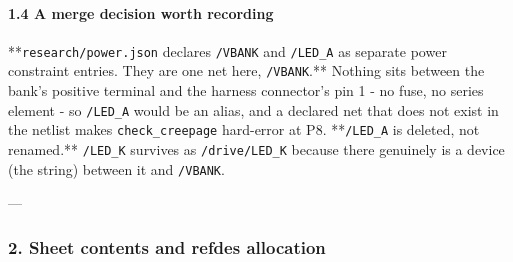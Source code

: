 \documentclass[11pt,a4paper]{article}
\begin{document}
\paragraph*{1.4 A merge decision worth recording}
{*}{*}\texttt{research/power.json} declares \texttt{/VBANK} and \texttt{/LED\_A} as separate power constraint entries. They are one net here, \texttt{/VBANK}.{*}{*} Nothing sits between the bank's positive terminal and the harness connector's pin 1 - no fuse, no series element - so \texttt{/LED\_A} would be an alias, and a declared net that does not exist in the netlist makes \texttt{check\_creepage} hard-error at P8. {*}{*}\texttt{/LED\_A} is deleted, not renamed.{*}{*} \texttt{/LED\_K} survives as \texttt{/drive/LED\_K} because there genuinely is a device (the string) between it and \texttt{/VBANK}.

---

\subsubsection*{2. Sheet contents and refdes allocation}
\end{document}

